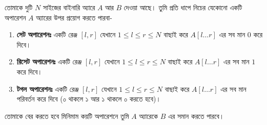 \begin{example}
তোমাকে দুটি $N$ সাইজের বাইনারি অ্যারে $A$ আর $B$ দেওয়া আছে। তুমি প্রতি ধাপে নিচের যেকোনো একটি অপারেশন $A$ অ্যারের উপর প্রয়োগ করতে পারবা-
\begin{enumerate}
	\item \textbf{সেট অপারেশনঃ} একটি রেঞ্জ $[l, r]$ যেখানে $1 \le l \le r \le N$ বাছাই করে $A[l \ldots r]$ এর সব মান $0$ করে দিবে।
	\item \textbf{রিসেট অপারেশনঃ} একটি রেঞ্জ $[l, r]$ যেখানে $1 \le l \le r \le N$ বাছাই করে $A[l \ldots r]$ এর সব মান $1$ করে দিবে।
	\item \textbf{টগল অপারেশনঃ} একটি রেঞ্জ $[l, r]$ যেখানে $1 \le l \le r \le N$ বাছাই করে $A[l \ldots r]$ এর সব মান পরিবর্তন করে দিবে (০ থাকলে ১ আর ১ থাকলে ০ করতে হবে)।
\end{enumerate}
তোমাকে বের করতে হবে মিনিমাম কয়টি অপারেশনে তুমি $A$ অ্যারেকে $B$ এর সমান করতে পারবে।
\end{example}
